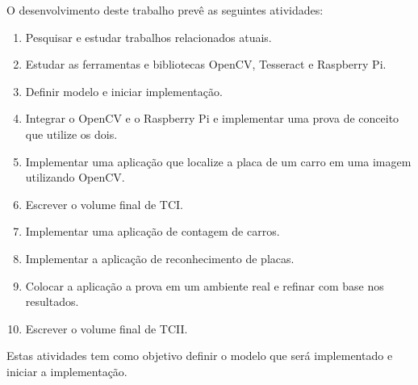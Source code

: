 O desenvolvimento deste trabalho prevê as seguintes atividades:

\begin{enumerate}[I]
	\item Pesquisar e estudar trabalhos relacionados atuais.
	\item Estudar as ferramentas e bibliotecas OpenCV, Tesseract e Raspberry Pi.
	\item Definir modelo e iniciar implementação.
	\item Integrar o OpenCV e o Raspberry Pi e implementar uma prova de conceito que utilize os dois.
	\item Implementar uma aplicação que localize a placa de um carro em uma imagem utilizando OpenCV.
	\item Escrever o volume final de TCI.
	\item Implementar uma aplicação de contagem de carros.
	\item Implementar a aplicação de reconhecimento de placas.
	\item Colocar a aplicação a prova em um ambiente real e refinar com base nos resultados.
	\item Escrever o volume final de TCII.
\end{enumerate}

Estas atividades tem como objetivo definir o modelo que será implementado
e iniciar a implementação.

